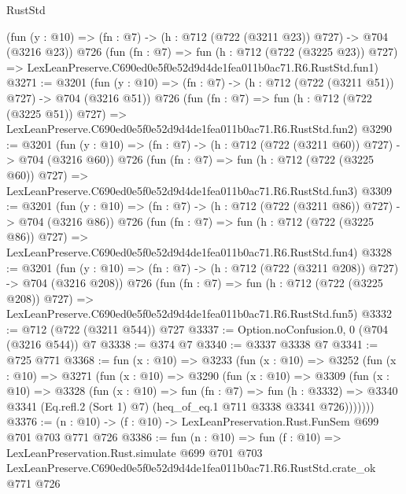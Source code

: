 \begin{lexlean}{RustStd}
\begin{coremodule}
    (fun (y : @10) => (fn : @7) -> (h : @712 (@722 (@3211 @23)) @727) -> @704 (@3216 @23))
    @726
    (fun (fn : @7) =>
    fun (h : @712 (@722 (@3225 @23)) @727) =>
    LexLeanPreserve.C690ed0e5f0e52d9d4de1fea011b0ac71.R6.RustStd.fun1)
@3271 := @3201
    (fun (y : @10) => (fn : @7) -> (h : @712 (@722 (@3211 @51)) @727) -> @704 (@3216 @51))
    @726
    (fun (fn : @7) =>
    fun (h : @712 (@722 (@3225 @51)) @727) =>
    LexLeanPreserve.C690ed0e5f0e52d9d4de1fea011b0ac71.R6.RustStd.fun2)
@3290 := @3201
    (fun (y : @10) => (fn : @7) -> (h : @712 (@722 (@3211 @60)) @727) -> @704 (@3216 @60))
    @726
    (fun (fn : @7) =>
    fun (h : @712 (@722 (@3225 @60)) @727) =>
    LexLeanPreserve.C690ed0e5f0e52d9d4de1fea011b0ac71.R6.RustStd.fun3)
@3309 := @3201
    (fun (y : @10) => (fn : @7) -> (h : @712 (@722 (@3211 @86)) @727) -> @704 (@3216 @86))
    @726
    (fun (fn : @7) =>
    fun (h : @712 (@722 (@3225 @86)) @727) =>
    LexLeanPreserve.C690ed0e5f0e52d9d4de1fea011b0ac71.R6.RustStd.fun4)
@3328 := @3201
    (fun (y : @10) => (fn : @7) -> (h : @712 (@722 (@3211 @208)) @727) -> @704 (@3216 @208))
    @726
    (fun (fn : @7) =>
    fun (h : @712 (@722 (@3225 @208)) @727) =>
    LexLeanPreserve.C690ed0e5f0e52d9d4de1fea011b0ac71.R6.RustStd.fun5)
@3332 := @712 (@722 (@3211 @544)) @727
@3337 := Option.noConfusion.{0, 0} (@704 (@3216 @544)) @7
@3338 := @374 @7
@3340 := @3337 @3338 @7
@3341 := @725 @771
@3368 := fun (x : @10) =>
  @3233
    (fun (x : @10) =>
    @3252
      (fun (x : @10) =>
      @3271
        (fun (x : @10) =>
        @3290
          (fun (x : @10) =>
          @3309
            (fun (x : @10) =>
            @3328
              (fun (x : @10) =>
              fun (fn : @7) =>
              fun (h : @3332) =>
              @3340 @3341 (Eq.refl.{2} (Sort 1) @7) (heq_of_eq.{1} @711 @3338 @3341 @726)))))))
@3376 := (n : @10) -> (f : @10) -> LexLeanPreservation.Rust.FunSem @699 @701 @703 @771 @726
@3386 := fun (n : @10) =>
  fun (f : @10) =>
  LexLeanPreservation.Rust.simulate
    @699
    @701
    @703
    LexLeanPreserve.C690ed0e5f0e52d9d4de1fea011b0ac71.R6.RustStd.crate_ok
    @771
    @726
\end{coremodule}
\end{lexlean}
